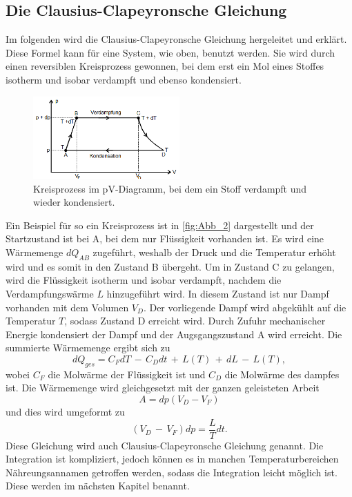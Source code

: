 \subsection{Die Clausius-Clapeyronsche Gleichung} %
\label{sub:CC-Gl}
Im folgenden wird die Clausius-Clapeyronsche Gleichung hergeleitet und erklärt. 
Diese Formel kann für eine System, wie oben, benutzt werden.
Sie wird durch einen reversiblen Kreisprozess gewonnen, bei dem erst ein Mol eines Stoffes isotherm und isobar verdampft und ebenso kondensiert.
\begin{figure}[H]
    \centering
    \includegraphics[width=0.5\textwidth]{build/Abb_2.PNG}
    \caption {Kreisprozess im pV-Diagramm, bei dem ein Stoff verdampft und wieder kondensiert.\cite{v203}}
    \label{fig:Abb_2}
\end{figure}
Ein Beispiel für so ein Kreisprozess ist in \autoref{fig:Abb_2} dargestellt und der Startzustand ist bei A, bei dem nur Flüssigkeit vorhanden ist.
Es wird eine Wärmemenge $dQ_{AB}$ zugeführt, weshalb der Druck und die Temperatur erhöht wird und es somit in den Zustand B übergeht.
Um in Zustand C zu gelangen, wird die Flüssigkeit isotherm und isobar verdampft, nachdem die Verdampfungswärme $L$ hinzugeführt wird.
In diesem Zustand ist nur Dampf vorhanden mit dem Volumen $V_D$.
Der vorliegende Dampf wird abgekühlt auf die Temperatur $T$, sodass Zustand D erreicht wird.
Durch Zufuhr mechanischer Energie kondensiert der Dampf und der Augsgangszustand A wird erreicht.
Die summierte Wärmemenge ergibt sich zu
\begin{equation}
    dQ_{ges} = C_F dT \,-\, C_D dt \,+\, L(T) \,+\, dL \,-\, L(T),
    \label{eqn:Wärmemenge}
\end{equation}
wobei $C_F$ die Molwärme der Flüssigkeit ist und $C_D$ die Molwärme des dampfes ist.
Die Wärmemenge wird gleichgesetzt mit der ganzen geleisteten Arbeit
\begin{equation}
    A = dp(V_D-V_F)
    \label{eqn:Arbeit}
\end{equation}
und dies wird umgeformt zu
\begin{equation}
    (V_D\,-\,V_F)dp = \frac{L}{T}dt .
    \label{eqn:CC-Gl}
\end{equation}
Diese Gleichung wird auch Clausius-Clapeyronsche Gleichung genannt. 
Die Integration ist kompliziert, jedoch können es in manchen Temperaturbereichen Nähreungsannamen getroffen werden, sodass die Integration leicht möglich ist.
Diese werden im nächsten Kapitel benannt.

